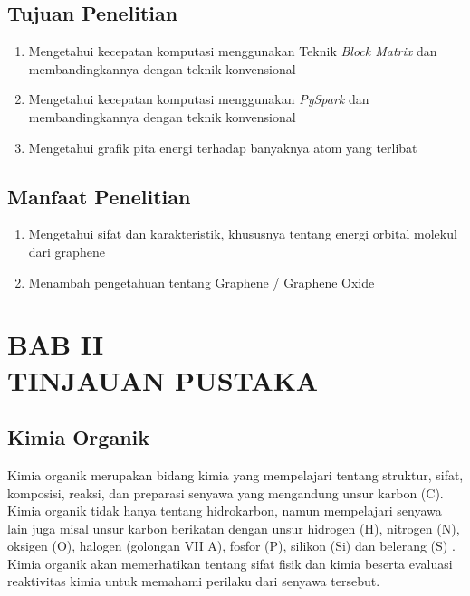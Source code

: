 \documentclass[12pt,a4paper]{report}
\begin{document}
	\section{Tujuan Penelitian}
	\begin{enumerate}
		\item Mengetahui kecepatan komputasi menggunakan Teknik \textit{Block Matrix} dan membandingkannya dengan teknik konvensional
		\item Mengetahui kecepatan komputasi menggunakan \textit{PySpark} dan membandingkannya dengan teknik konvensional
		\item Mengetahui grafik pita energi terhadap banyaknya atom yang terlibat
	\end{enumerate}

	\section{Manfaat Penelitian}
	\begin{enumerate}
		\item Mengetahui sifat dan karakteristik, khususnya tentang energi orbital molekul dari graphene 
		\item Menambah pengetahuan tentang Graphene / Graphene Oxide
	\end{enumerate}

\chapter*{BAB II \\ TINJAUAN PUSTAKA}
\setcounter{chapter}{2}
\setcounter{section}{0}
\setcounter{figure}{0}
\thispagestyle{myplain}
	\section{Kimia Organik}
	Kimia organik merupakan bidang kimia yang mempelajari tentang struktur, sifat, komposisi, reaksi, dan preparasi senyawa yang mengandung unsur karbon (C). Kimia organik tidak hanya tentang hidrokarbon, namun mempelajari senyawa lain juga misal unsur karbon berikatan dengan unsur hidrogen (H), nitrogen (N), oksigen (O), halogen (golongan VII A), fosfor (P), silikon (Si) dan belerang (S) \cite{ACS2020}. Kimia organik akan memerhatikan tentang sifat fisik dan kimia beserta evaluasi reaktivitas kimia untuk memahami perilaku dari senyawa tersebut.
	
\end{document}

